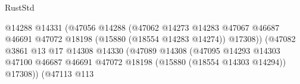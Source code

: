 \begin{lexlean}{RustStd}
\begin{coremodule}
                                                                @14288
                                                                @14331
                                                                (@47056
                                                                  @14288
                                                                  (@47062
                                                                    @14273
                                                                    @14283
                                                                    @47067
                                                                    @46687
                                                                    @46691
                                                                    @47072
                                                                    @18198
                                                                    (@15880 (@18554 @14283 @14274))
                                                                    @17308))
                                                                (@47082
                                                                  @3861
                                                                  @13
                                                                  @17
                                                                  @14308
                                                                  @14330
                                                                  (@47089
                                                                    @14308
                                                                    (@47095
                                                                      @14293
                                                                      @14303
                                                                      @47100
                                                                      @46687
                                                                      @46691
                                                                      @47072
                                                                      @18198
                                                                      (@15880
                                                                        (@18554 @14303 @14294))
                                                                      @17308))
                                                                  (@47113
                                                                    @113

\end{coremodule}
\end{lexlean}
